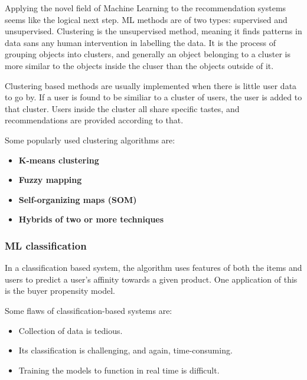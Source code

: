 \documentclass{article}
\begin{document}
Applying the novel field of Machine Learning to the recommendation systems seems like the logical next step. ML methods are of two types: supervised and unsupervised. Clustering is the unsupervised method, meaning it finds patterns in data sans any human intervention in labelling the data. It is the process of grouping objects into clusters, and generally an object belonging to a cluster is more similar to the objects inside the cluser than the objects outside of it.

\medskip

\noindent Clustering based methods are usually implemented when there is little user data to go by. If a user is found to be similiar to a cluster of users, the user is added to that cluster. Users inside the cluster all share specific tastes, and recommendations are provided according to that.

\medskip

\noindent Some popularly used clustering algorithms are:

\begin{itemize}
	\item{\textbf{K-means clustering}}
	\item{\textbf{Fuzzy mapping}}
	\item{\textbf{Self-organizing maps (SOM)}}
	\item{\textbf{Hybrids of two or more techniques}}
\end{itemize}

\subsubsection{ML classification}

In a classification based system, the algorithm uses features of both the items and users to predict a user's affinity towards a given product. One application of this is the buyer propensity model.

\medskip

\noindent Some flaws of classification-based systems are:

\begin{itemize}
    \item{Collection of data is tedious.}
    \item{Its classification is challenging, and again, time-consuming.}
    \item{Training the models to function in real time is difficult.}
\end{itemize}
\end{document}
